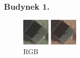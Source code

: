 \documentclass[a4paper,12pt]{article}  %
\begin{document}
\subsubsection{Budynek 1.}
\begin{figure}[H]
    \centering
    \begin{minipage}{0.24\textwidth}
        \centering
        \includegraphics[width=\linewidth]{spektralne/rgb_budynek7.png}
        \caption*{RGB}
    \end{minipage}
    \begin{minipage}{0.24\textwidth}
        \centering
        \includegraphics[width=\linewidth]{spektralne/irgb_budynek7.png}

\end{minipage}
\end{figure}
\end{document}
